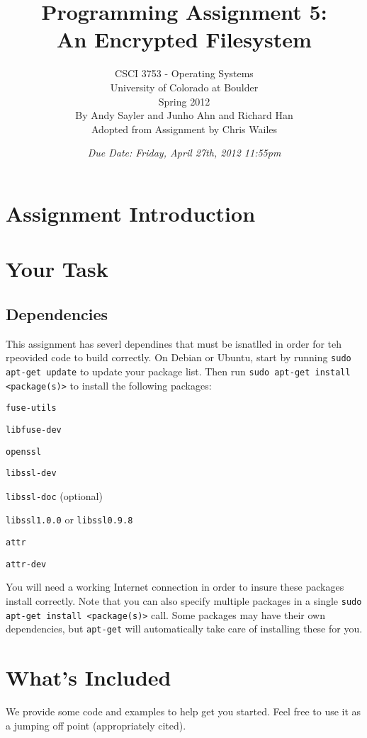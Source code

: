 \documentclass[12pt]{article}
\title{Programming Assignment 5:\\An Encrypted Filesystem}
\author{
  CSCI 3753 - Operating Systems\\
  University of Colorado at Boulder\\
  Spring 2012\\
  By Andy Sayler and Junho Ahn and Richard Han\\
  Adopted from Assignment by Chris Wailes
}
\date{\emph{Due Date: Friday, April 27th, 2012 11:55pm}}
\newenvironment{packed_item}{
\begin{itemize}
  \setlength{\itemsep}{1pt}
  \setlength{\parskip}{0pt}
  \setlength{\parsep}{0pt}
}{\end{itemize}}
\begin{document}
\maketitle

\section{Assignment Introduction}


\section{Your Task}

\subsection{Dependencies}
This assignment has severl dependines that must be isnatlled in order
for teh rpeovided code to build correctly. On Debian or Ubuntu, start
by running \texttt{sudo apt-get update} to update your package
list. Then run \texttt{sudo apt-get install <package(s)>} to install the
following packages:

\begin{packed_item}
\item \texttt{fuse-utils}
\item \texttt{libfuse-dev}
\item \texttt{openssl}
\item \texttt{libssl-dev}
\item \texttt{libssl-doc} (optional)
\item \texttt{libssl1.0.0} or \texttt{libssl0.9.8}
\item \texttt{attr}
\item \texttt{attr-dev}
\end{packed_item}

You will need a working Internet connection in order to insure these
packages install correctly. Note that you can also specify multiple
packages in a single \texttt{sudo apt-get install <package(s)>}
call. Some packages may have their own dependencies, but
\texttt{apt-get} will automatically take care of installing these for you.

\section{What's Included}

We provide some code and examples to help get you started.
Feel free to use it as a jumping off point (appropriately cited).
\end{document}
